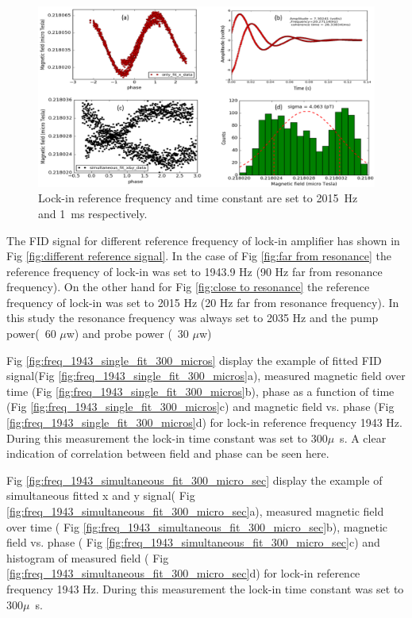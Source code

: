   \begin{figure}[h]
\centering\includegraphics[width=0.8\linewidth]{figures/freq_2015_simultaneous_fit_1ms.png}
\caption{Lock-in reference frequency and time constant are set to 2015~Hz and 1~ms respectively. \label{fig:freq_2015_1ms}}
\end{figure}


 
  The FID signal for different reference frequency of lock-in amplifier has shown in Fig \ref{fig:different reference signal}. In the case of Fig \ref{fig:far from resonance} the reference frequency of lock-in was set to 1943.9 Hz (90 Hz far from resonance frequency). On the other hand for Fig \ref{fig:close to resonance} the reference frequency of lock-in was set to 2015 Hz (20 Hz far from resonance frequency). In this study the resonance frequency was always set to 2035 Hz and the pump power(~60 $\mu$w) and probe power (~30 $\mu$w)
  
  Fig \ref{fig:freq_1943_single_fit_300_micros} display the example of fitted FID signal(Fig \ref{fig:freq_1943_single_fit_300_micros}a), measured magnetic field over time (Fig \ref{fig:freq_1943_single_fit_300_micros}b), phase as a function of time (Fig \ref{fig:freq_1943_single_fit_300_micros}c) and magnetic field vs. phase (Fig \ref{fig:freq_1943_single_fit_300_micros}d) for lock-in reference frequency 1943 Hz. During this measurement the lock-in time constant was set to 300$\mu$~s. A clear indication of correlation between field and phase can be seen here.
  
   Fig \ref{fig:freq_1943_simultaneous_fit_300_micro_sec} display the example of simultaneous fitted x and y signal( Fig \ref{fig:freq_1943_simultaneous_fit_300_micro_sec}a), measured magnetic field over time ( Fig \ref{fig:freq_1943_simultaneous_fit_300_micro_sec}b), magnetic field vs. phase ( Fig \ref{fig:freq_1943_simultaneous_fit_300_micro_sec}c) and histogram of measured field ( Fig \ref{fig:freq_1943_simultaneous_fit_300_micro_sec}d) for lock-in reference frequency 1943 Hz. During this measurement the lock-in time constant was set to 300$\mu$~s. 
   
